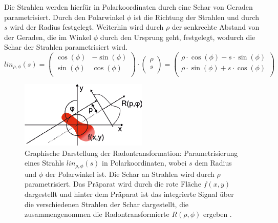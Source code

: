 
Die Strahlen werden hierfür in Polarkoordinaten durch eine Schar von Geraden parametrisiert. Durch den Polarwinkel $\phi$ ist die Richtung der Strahlen und durch $s$ wird der \glqq Radius\grqq{} festgelegt. Weiterhin wird durch $\rho$ der senkrechte Abstand von der Geraden, die im Winkel $\phi$ durch den Ursprung geht, festgelegt, wodurch die Schar der Strahlen parametrisiert wird.  
\begin{equation}
lin_{\rho,\phi}(s) = \begin{pmatrix}
\cos(\phi) & -\sin(\phi)  \\
\sin(\phi) & \cos(\phi) \\
\end{pmatrix}
\cdot
\begin{pmatrix}
\rho \\
s \\
\end{pmatrix}
 =
\begin{pmatrix}
\rho \cdot \cos(\phi) - s \cdot \sin(\phi) \\
\rho \cdot \sin(\phi) + s \cdot \cos(\phi) \\
\end{pmatrix}
\end{equation}

\begin{figure}
	\centering
\includegraphics[width=0.6\linewidth]{IMAGE/radon.png}
	\caption{Graphische Darstellung der Radontransformation: Parametrisierung eines Strahls $lin_{\rho,\phi}(s)$ in Polarkoordinaten, wobei $s$ dem Radius und $\phi$ der Polarwinkel ist. Die Schar an Strahlen wird durch $\rho$ parametrisiert.
Das Präparat wird durch die rote Fläche $f(x,y)$ dargestellt und hinter dem Präparat ist das integrierte Signal über die verschiedenen Strahlen der Schar dargestellt, die zusammengenommen die Radontransformierte $R(\rho, \phi)$ ergeben \cite{slot_paper}.}
	\label{fig:radon}
\end{figure}

